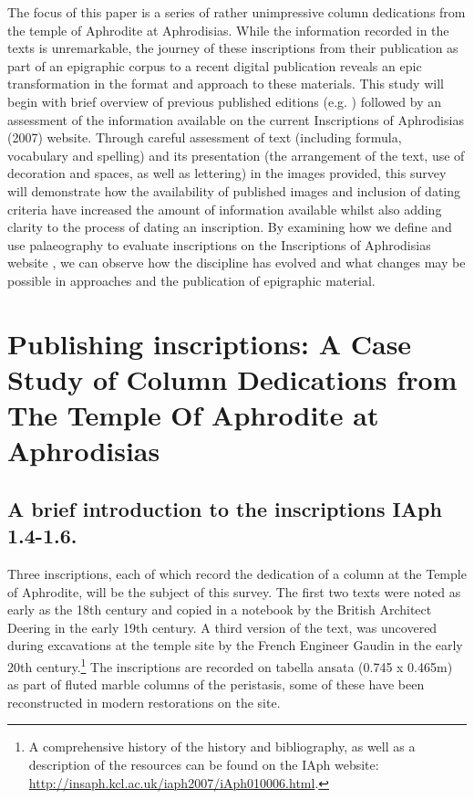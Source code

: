 \documentclass[amsthm,ebook]{saparticle}
\begin{document}
\noindent The focus of this paper is a series of rather unimpressive column dedications from the temple of Aphrodite at
Aphrodisias. While the information recorded in the texts is unremarkable, the journey of these inscriptions from
their publication as part of an epigraphic corpus to a recent digital publication reveals an epic transformation in the
format and approach to these materials. This study will begin with brief overview of previous published editions
(e.g. \citet{mama8}) followed by an assessment of the information available on the current Inscriptions of
Aphrodisias (2007) website. Through careful assessment of text (including formula, vocabulary and spelling) and its
presentation (the arrangement of the text, use of decoration and spaces, as well as lettering) in the images provided,
this survey will demonstrate how the availability of published images and inclusion of dating criteria have increased
the amount of information available whilst also adding clarity to the process of dating an inscription. By examining
how we define and use palaeography to evaluate inscriptions on the Inscriptions of Aphrodisias website \citep{ReynoldsRouecheBodard2007}, we
can observe how the discipline has evolved and what changes may be possible in approaches and the publication of
epigraphic material. 

%


\section{Publishing inscriptions: A Case Study of Column Dedications from The Temple Of Aphrodite at Aphrodisias}

\subsection{A brief introduction to the inscriptions IAph 1.4-1.6.}


\noindent Three inscriptions, each of which record the dedication of a column at the Temple of Aphrodite, will be the subject of
this survey. The first two texts were noted as early as the 18th century and copied in a notebook by the British
Architect Deering in the early 19th century. A third version of the text, was uncovered during excavations at the
temple site by the French Engineer Gaudin in the early 20th century.\footnote{ A comprehensive history of the history
and bibliography, as well as a description of the resources can be found on the IAph website:
\url{http://insaph.kcl.ac.uk/iaph2007/iAph010006.html}. } The inscriptions are recorded on tabella ansata (0.745 x 0.465m) as
part of fluted marble columns of the peristasis, some of these have been reconstructed in modern restorations on the
site. 
\end{document}
